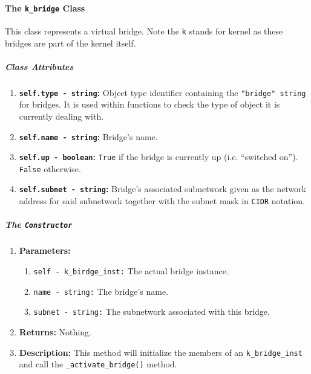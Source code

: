                 \paragraph{The \texttt{k\_bridge} Class}
                    This class represents a virtual bridge. Note the \texttt{k} stands for kernel as these bridges are part of the kernel itself.

                    \subparagraph{Class Attributes}
                        \begin{enumerate}
                            \item \textbf{\texttt{self.type - string}:} Object type identifier containing the \texttt{"bridge" string} for bridges. It is used within functions to check the type of object it is currently dealing with.
                            \item \textbf{\texttt{self.name - string}:} Bridge's name.
                            \item \textbf{\texttt{self.up - boolean}:} \texttt{True} if the bridge is currently up (i.e. ``switched on''). \texttt{False} otherwise.
                            \item \textbf{\texttt{self.subnet - string}:} Bridge's associated subnetwork given as the network address for said subnetwork together with the subnet mask in \texttt{CIDR} notation.
                        \end{enumerate}

                    \subparagraph{The \texttt{Constructor}}
                        \begin{enumerate}
                            \item \textbf{Parameters:}
                            \begin{enumerate}
                                \item \texttt{self - k\_birdge\_inst:} The actual bridge instance.
                                \item \texttt{name - string:} The bridge's name.
                                \item \texttt{subnet - string:} The subnetwork associated with this bridge.
                            \end{enumerate}
                            \item \textbf{Returns:} Nothing.
                            \item \textbf{Description:} This method will initialize the members of an \texttt{k\_bridge\_inst} and call the \texttt{\_activate\_bridge()} method.
                        \end{enumerate}

